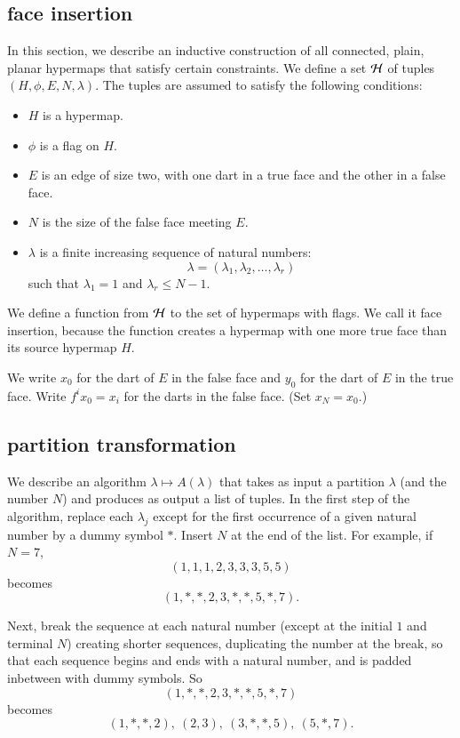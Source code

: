 \subsection{face insertion}\label{sec:face-insert}


In this section, we describe an inductive construction of all
connected, plain, planar hypermaps that satisfy certain constraints.
We define a set ${\cal H}$ of tuples $(H,\phi,E,N,\lambda)$.
The tuples are assumed to satisfy the following conditions:
\begin{itemize}
    \item $H$ is a hypermap.
    \item $\phi$ is a flag on $H$.
    \item $E$ is an edge of size two, with one
    dart in a true face and the other in a false face.
    \item $N$ is the size of the false face meeting $E$.
    \item $\lambda$ is a finite increasing sequence of natural numbers:
        $$
        \lambda = (\lambda_1,\lambda_2,\ldots,\lambda_r)
        $$
    such that $\lambda_1 = 1$ and $\lambda_r \le N-1$.
\end{itemize}

We define a function from $\cal H$ to the set of hypermaps with
flags.  We call it face insertion, because the function creates a
hypermap with one more true face than its source hypermap $H$.

We write $x_0$ for the dart of $E$ in the
false face and $y_0$ for the dart of $E$ in the true face.  
Write $f^i
x_0 = x_i$ for the darts in the false face.  (Set $x_N = x_0$.)

\subsection{partition transformation}

We describe an algorithm $\lambda\mapsto A(\lambda)$ that takes
as input a partition $\lambda$ (and the number $N$)
and produces as output a list of
tuples.
In the first step of the algorithm,
replace each $\lambda_j$ except for the
first occurrence of a given natural number by a dummy symbol $*$.
Insert $N$ at the end of the list. For example, if $N=7$,
    $$(1,1,1,2,3,3,3,5,5)$$ becomes
    $$(1,*,*,2,3,*,*,5,*,7).$$

Next, break the sequence at each natural number (except at the initial $1$
and terminal $N$)
creating shorter sequences, duplicating the number at the break,
so that each sequence begins and ends with a natural number,
and is padded inbetween with dummy symbols. So
    $$(1,*,*,2,3,*,*,5,*,7)$$ becomes
$$(1,*,*,2),\ (2,3),\ (3,*,*,5),\ (5,*,7).$$

